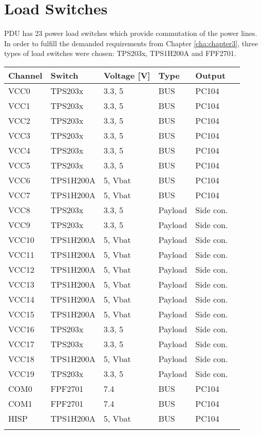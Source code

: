 \section{Load Switches}
PDU has 23 power load switches which provide commutation of the power lines. In order to fulfill the demanded requirements from Chapter \ref{cha:chapter3}, three types of load switches were chosen: TPS203x, TPS1H200A and FPF2701. 
\begin{tabular}{p{2cm}p{2cm}p{2cm}p{2cm}p{2cm}p{2cm}} \toprule
	Channel & Switch  & Voltage [V] & Type & Output\\ \midrule
	VCC0 & TPS203x & 3.3, 5 & BUS & PC104\\
	VCC1 & TPS203x & 3.3, 5 & BUS & PC104\\
	VCC2 & TPS203x & 3.3, 5 & BUS & PC104\\
	VCC3 & TPS203x & 3.3, 5 & BUS & PC104\\
	VCC4 & TPS203x & 3.3, 5 & BUS & PC104\\
    VCC5 & TPS203x & 3.3, 5 & BUS & PC104\\
    VCC6 & TPS1H200A & 5, Vbat & BUS & PC104\\
    VCC7 & TPS1H200A & 5, Vbat & BUS & PC104\\
    VCC8 & TPS203x & 3.3, 5 & Payload & Side con.\\
    VCC9 & TPS203x & 3.3, 5 & Payload & Side con.\\
    VCC10 & TPS1H200A & 5, Vbat & Payload & Side con.\\
    VCC11 & TPS1H200A & 5, Vbat & Payload & Side con.\\
    VCC12 & TPS1H200A & 5, Vbat & Payload & Side con.\\
    VCC13 & TPS1H200A & 5, Vbat & Payload & Side con.\\
    VCC14 & TPS1H200A & 5, Vbat & Payload & Side con.\\
    VCC15 & TPS1H200A & 5, Vbat & Payload & Side con.\\
    VCC16 & TPS203x & 3.3, 5 & Payload & Side con.\\
    VCC17 & TPS203x & 3.3, 5 & Payload & Side con.\\
    VCC18 & TPS1H200A & 5, Vbat & Payload & Side con.\\
    VCC19 & TPS203x & 3.3, 5 & Payload & Side con.\\
    COM0 & FPF2701 & 7.4 & BUS & PC104\\
    COM1 & FPF2701 & 7.4 & BUS & PC104\\
    HISP & TPS1H200A & 5, Vbat & BUS & PC104\\ \\
	\bottomrule
	
\end{tabular}\\ \\ \\ \\

